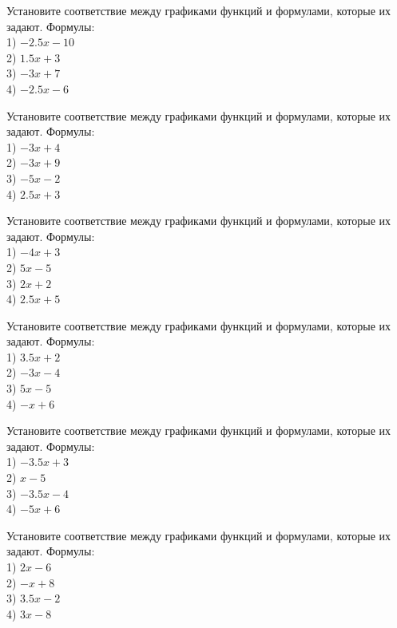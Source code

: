 \documentclass[4apaper]{article}
\begin{document}
\begin{taskBN}{91}
Установите соответствие между графиками функций и формулами, которые их задают. Формулы: \\1) $-2.5x-10$\\2) $1.5x+3$\\3) $-3x+7$\\4) $-2.5x-6$
\end{taskBN}

\begin{taskBN}{92}
Установите соответствие между графиками функций и формулами, которые их задают. Формулы: \\1) $-3x+4$\\2) $-3x+9$\\3) $-5x-2$\\4) $2.5x+3$
\end{taskBN}

\begin{taskBN}{93}
Установите соответствие между графиками функций и формулами, которые их задают. Формулы: \\1) $-4x+3$\\2) $5x-5$\\3) $2x+2$\\4) $2.5x+5$
\end{taskBN}

\begin{taskBN}{94}
Установите соответствие между графиками функций и формулами, которые их задают. Формулы: \\1) $3.5x+2$\\2) $-3x-4$\\3) $5x-5$\\4) $-x+6$
\end{taskBN}

\begin{taskBN}{95}
Установите соответствие между графиками функций и формулами, которые их задают. Формулы: \\1) $-3.5x+3$\\2) $x-5$\\3) $-3.5x-4$\\4) $-5x+6$
\end{taskBN}

\begin{taskBN}{96}
Установите соответствие между графиками функций и формулами, которые их задают. Формулы: \\1) $2x-6$\\2) $-x+8$\\3) $3.5x-2$\\4) $3x-8$
\end{taskBN}
\end{document}
